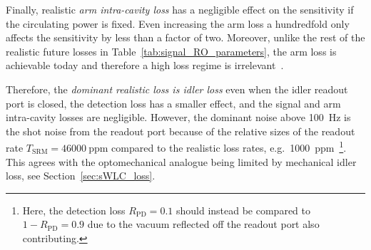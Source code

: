 Finally, realistic \emph{arm intra-cavity loss} has a negligible effect on the sensitivity if the circulating power is fixed. Even increasing the arm loss a hundredfold only affects the sensitivity by less than a factor of two. Moreover, unlike the rest of the realistic future losses in Table~\ref{tab:signal_RO_parameters}, the arm loss is achievable today and therefore a high loss regime is irrelevant~\cite{hardwick_2019,zhangBroadbandSignalRecycling2021}. %

Therefore, the \emph{dominant realistic loss is idler loss} even when the idler readout port is closed, the detection loss has a smaller effect, and the signal and arm intra-cavity losses are negligible. However, the dominant noise above 100~Hz is the shot noise from the readout port because of the relative sizes of the readout rate $T_\text{SRM}=46000~\text{ppm}$ compared to the realistic loss rates, e.g.\ 1000~ppm~\footnote{Here, the detection loss $R_\text{PD}=0.1$ should instead be compared to $1-R_\text{PD}=0.9$ due to the vacuum reflected off the readout port also contributing.}. This agrees with the optomechanical analogue being limited by mechanical idler loss, see Section~\ref{sec:sWLC_loss}. 

